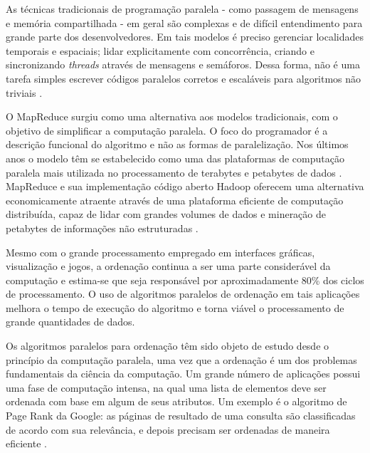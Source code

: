 
As técnicas tradicionais de programação paralela - como passagem de mensagens e memória compartilhada - em geral são complexas e de difícil entendimento para grande parte dos desenvolvedores. Em tais modelos é preciso gerenciar localidades temporais e espaciais; lidar explicitamente com concorrência, criando e sincronizando \textit{threads} através de mensagens e semáforos. Dessa forma, não é uma tarefa simples escrever códigos paralelos corretos e escaláveis para algoritmos não triviais \cite{Breshears:2009}.


O MapReduce surgiu como uma alternativa aos modelos tradicionais, com o objetivo de simplificar a computação paralela. 
O foco do programador é a descrição funcional do algoritmo e não as formas de paralelização. Nos últimos anos o modelo têm se estabelecido como uma das plataformas de computação paralela mais utilizada no processamento de terabytes e petabytes de dados \cite{Ranger:2007}.
MapReduce e sua implementação código aberto Hadoop oferecem  uma alternativa economicamente atraente através de uma plataforma eficiente de computação distribuída, capaz de lidar com grandes volumes de dados e mineração de petabytes de informações não estruturadas \cite{Cherkasova:2011}.

Mesmo com o grande processamento  empregado em interfaces gráficas, visualização e jogos, a ordenação continua a ser uma parte considerável da computação e estima-se que seja responsável por aproximadamente 80\% dos ciclos de processamento\cite{Ranger:2007}. O uso de algoritmos paralelos de ordenação em tais aplicações melhora o tempo de execução do algoritmo e torna viável o processamento de grande quantidades de dados.


Os algoritmos paralelos para ordenação têm sido objeto de estudo desde o princípio da computação paralela, uma vez que a  ordenação é um dos problemas fundamentais da ciência da computação.
Um grande número de aplicações possui uma fase de computação intensa, na qual uma lista de elementos deve ser ordenada com base em algum de seus atributos. Um exemplo é o algoritmo de Page Rank \cite{Page:1999} da Google: as páginas de resultado de uma consulta são classificadas de acordo com sua relevância, e depois precisam ser ordenadas de maneira eficiente \cite{Kale:2010}. 
 

